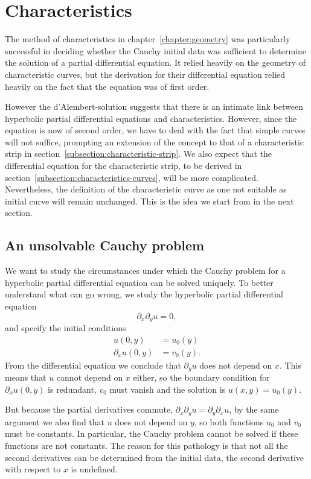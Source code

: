 %
%
%
\section{Characteristics}
The method of characteristics in chapter~\ref{chapter:geometry} 
was particularly successful in deciding whether the Cauchy initial
data was sufficient to determine the solution of a partial differential
equation.
It relied heavily on the geometry of characteristic curves, but the
derivation for their differential equation relied heavily on the fact
that the equation was of first order.

However the d'Alembert-solution suggests that there is an intimate
link between hyperbolic partial differential equations and characteristics.
However, since the equation is now of second order, we have to deal
with the fact that simple curves will not suffice, prompting an extension
of the concept to that of a characteristic strip in
section~\ref{subsection:characteristic-strip}.
We also expect that the differential equation for the characteristic
strip, to be derived in section~\ref{subsection:characteristics-curves},
will be more complicated.
Nevertheless, the definition of the characteristic curve as one not
suitable as initial curve will remain unchanged.
This is the idea we start from in the next section.

\subsection{An unsolvable Cauchy problem}
We want to study the circumstances under which the Cauchy problem
for a hyperbolic partial differential equation can be solved
uniquely.
To better understand what can go wrong, we study the hyperbolic
partial differential equation
\[
\partial_x\partial_y u=0,
\]
and specify the initial conditions
\begin{align*}
u(0,y)&=u_0(y)
\\
\partial_xu(0,y)&=v_0(y).
\end{align*}
From the differential equation we conclude that $\partial_y u$
does not depend on $x$.
This means that $u$ cannot depend on $x$ either, so the boundary
condition for $\partial_xu(0,y)$ is redundant, $v_0$ must vanish
and the solution is $u(x,y)=u_0(y)$.

But because the partial derivatives commute,
$\partial_x\partial_yu=\partial_y\partial_xu$, by the same
argument we also find that $u$ does not depend on $y$, so both functions
$u_0$ and $v_0$ must be constants.
In particular, the Cauchy problem cannot be solved if these
functions are not constants.
The reason for this pathology is that not all the second derivatives can be
determined from the initial data, the second derivative with respect
to $x$ is undefined.

